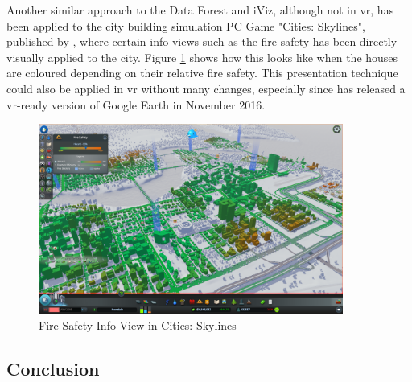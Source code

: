 Another similar approach to the Data Forest and iViz, although not in \gls{vr}, has been applied to the city building simulation PC Game "Cities: Skylines", published by \cite{Paradox2014}, where certain info views such as the fire safety has been directly visually applied to the city. Figure \ref{fig:citiesskylinesfiresafety} shows how this looks like when the houses are coloured depending on their relative fire safety. This presentation technique could also be applied in \gls{vr} without many changes, especially since \cite{Google2016a} has released a \gls{vr}-ready version of Google Earth in November 2016.
\begin{figure}[b]
	\begin{center}
		\includegraphics[width=10cm]{03_Figures/05_LitReview/ParadoxWiki2014_CitiesSkylines.png}
		\caption[Fire Safety Info View in Cities: Skylines]{Fire Safety Info View in Cities: Skylines \citep{Paradox2014}}
		\label{fig:citiesskylinesfiresafety}
	\end{center}
\end{figure}



\subsection{Conclusion}

